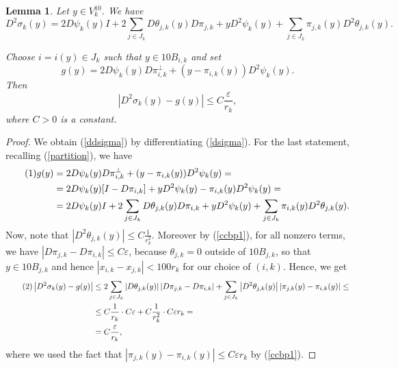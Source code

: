 \documentclass[11pt, twoside, leqno]{article}
\numberwithin{equation}{section}
\newcommand\numberthis{\addtocounter{equation}{1}\tag{\theequation}}
\theoremstyle{plain}
\newtheorem{lem}[thm]{Lemma}
\theoremstyle{definition}
\newcommand{\e}{\varepsilon} %
\begin{document}
\begin{lem} \label{idk}
Let $y \in V_k^{10}$. We have
\begin{equation}  \label{ddsigma}
D^2\sigma_k(y) = 2 D\psi_k(y)I  + 2\sum_{j \in J_k} D\theta_{j,k}(y)D\pi_{j,k} + y D^2\psi_k(y) + \sum_{j \in J_k} \pi_{j,k}(y)D^2\theta_{j,k}(y).
\end{equation}

Choose $i=i(y) \in J_k$ such that $y \in 10B_{i,k}$ and set
\begin{equation}
g(y)= 2 D\psi_k(y)D\pi^{\perp}_{i,k}+ (y-\pi_{i,k}(y))D^2\psi_k(y). 
\end{equation}
Then
\begin{equation} \label{d2g}
\left|D^2\sigma_k(y) - g(y)\right|  \leq C \frac{\e}{r_k},
\end{equation}
where $C>0$ is a constant.
\end{lem}


\begin{proof}
We obtain (\ref{ddsigma}) by differentiating (\ref{dsigma}). For the last statement, recalling (\ref{partition}), we have
\begin{align*} \numberthis
g(y) & =  2 D\psi_k(y)D\pi^{\perp}_{i,k}+ (y-\pi_{i,k}(y))D^2\psi_k(y) = \\
& = 2 D\psi_k(y)[I-D\pi_{i,k}]+ yD^2\psi_k(y)-\pi_{i,k}(y)D^2\psi_k(y) = \\
& = 2 D\psi_k(y)I + 2 \sum_{j\in J_k} D\theta_{j,k}(y)D\pi_{i,k} + yD^2\psi_k(y) + \sum_{j\in J_k} \pi_{i,k}(y)D^2\theta_{j,k}(y).
\end{align*}
Now, note that $\left| D^2\theta_{j,k}(y)\right| \leq C\frac{1}{r_k^2}$. Moreover by (\ref{ccbp1}), for all nonzero terms, we have $\left| D\pi_{j,k}-D\pi_{i,k}\right| \leq C \e$, because $\theta_{j,k}=0$ outside of $10B_{j,k}$, so that $y \in 10B_{j,k}$ and hence $|x_{i,k}-x_{j,k}|<100r_k$ for our choice of $(i,k)$.
Hence, we get
\begin{align*} \numberthis
\left|D^2\sigma_k(y) - g(y)\right| & \leq 2\sum_{j \in J_k} \left|D\theta_{j,k}(y)\right| \left| D\pi_{j,k}-D\pi_{i,k}\right|  + \sum_{j \in J_k} \left| D^2\theta_{j,k}(y) \right| \left|\pi_{j,k}(y)-\pi_{i,k}(y)\right| \leq \\
& \leq C\frac{1}{r_k} \cdot C \e + C\frac{1}{r_k^2} \cdot C \e r_k = \\
& = C\frac{\e}{r_k},
\end{align*}
where we used the fact that $\left|\pi_{j,k}(y)-\pi_{i,k}(y)\right| \leq C \e r_k$ by (\ref{ccbp1}).
\end{proof}
\end{document}
